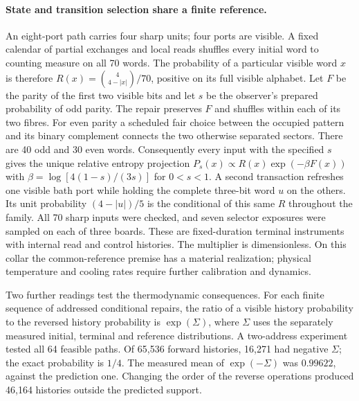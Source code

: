 \documentclass[11pt]{article}
\theoremstyle{remark}
\theoremstyle{plain}
\begin{document}
\paragraph{State and transition selection share a finite reference.}
An eight-port path carries four sharp units; four ports are visible.
A fixed calendar of partial exchanges and local reads shuffles every
initial word to counting measure on all 70 words. The probability of a
particular visible word $x$ is therefore
$R(x)=\binom{4}{4-|x|}/70$, positive on its full visible alphabet.
Let $F$ be the parity of the first two visible bits and let $s$ be the
observer's prepared probability of odd parity. The repair preserves $F$
and shuffles within each of its two fibres. For even parity a scheduled
fair choice between the occupied pattern and its binary complement connects
the two otherwise separated sectors. There are 40 odd and 30 even words.
Consequently every input with the specified $s$ gives the unique relative
entropy projection $P_s(x)\propto R(x)\exp(-\beta F(x))$ with
$\beta=\log[4(1-s)/(3s)]$ for $0<s<1$. A second transaction refreshes
one visible bath port while holding the complete three-bit word $u$ on
the others. Its unit probability $(4-|u|)/5$ is the conditional of this
same $R$ throughout the family. All 70 sharp inputs were checked, and
seven selector exposures were sampled on each of three boards.
These are fixed-duration terminal instruments with internal read and
control histories. The multiplier is dimensionless. On this collar the
common-reference premise has a material realization; physical temperature
and cooling rates require further calibration and dynamics.

Two further readings test the thermodynamic consequences. For each
finite sequence of addressed conditional repairs, the ratio of a visible
history probability to the reversed history probability is
$\exp(\Sigma)$, where $\Sigma$ uses the separately measured initial,
terminal and reference distributions. A two-address experiment tested
all 64 feasible paths. Of 65,536 forward histories, 16,271 had negative
$\Sigma$; the exact probability is $1/4$. The measured mean of
$\exp(-\Sigma)$ was $0.99622$, against the prediction one.
Changing the order of the reverse operations produced 46,164 histories
outside the predicted support.
\end{document}
